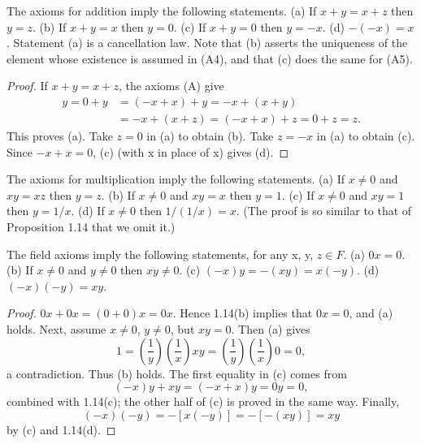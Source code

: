 \begin{proposition} %
  \label{prop:chap1:addition_axiom_consequences}
  The axioms for addition imply the following statements.
  (a) If $x+y = x+z$ then $y=z$.
  (b) If $x+y = x$ then $y=0$.
  (c) If $x+y = 0$ then $y=-x$.
  (d) $-(-x) = x$.
  Statement (a) is a cancellation law. Note that (b) asserts the
  uniqueness of the element whose existence is assumed in (A4), and
  that (c) does the same for (A5).
  \begin{proof}
    If $x+y = x+z$, the axioms (A) give
    \begin{align*} y = 0+y &= (-x+x)+y = -x+(x+y) \\ &= -x+(x+z) =
      (-x+x)+z = 0+z = z.
    \end{align*}
    This proves (a). Take $z=0$ in (a) to obtain (b). Take $z=-x$ in
    (a) to obtain (c).
    Since $-x+x=0$, (c) (with x in place of x) gives (d).
  \end{proof}
\end{proposition}

\begin{proposition} %
  \label{prop:chap1:multiplication_axiom_consequences}
  The axioms for multiplication imply the following statements.
  (a) If $x \ne 0$ and $xy = xz$ then $y=z$.
  (b) If $x \ne 0$ and $xy = x$ then $y=1$.
  (c) If $x \ne 0$ and $xy = 1$ then $y=1/x$.
  (d) If $x \ne 0$ then $1/(1/x) = x$.
  (The proof is so similar to that of Proposition 1.14 that we omit it.)
\end{proposition}

\begin{proposition} %
  \label{prop:chap1:field_axiom_consequences}
  The field axioms imply the following statements, for any x, y, $z \in F$.
  (a) $0x = 0$.
  (b) If $x \ne 0$ and $y \ne 0$ then $xy \ne 0$.
  (c) $(-x)y = -(xy) = x(-y)$.
  (d) $(-x)(-y) = xy$.
  \begin{proof}
    $0x + 0x = (0+0)x = 0x$. Hence 1.14(b) implies that $0x=0$, and (a) holds.
    Next, assume $x \ne 0$, $y \ne 0$, but $xy=0$. Then (a) gives
    \[ 1 = (\frac{1}{y})(\frac{1}{x})xy = (\frac{1}{y})(\frac{1}{x})0 = 0, \]
    a contradiction. Thus (b) holds.
    The first equality in (c) comes from
    \[ (-x)y + xy = (-x+x)y = 0y = 0, \]
    combined with 1.14(c); the other half of (c) is proved in the
    same way. Finally,
    \[ (-x)(-y) = -[x(-y)] = -[-(xy)] = xy \]
    by (c) and 1.14(d).
  \end{proof}
\end{proposition}


